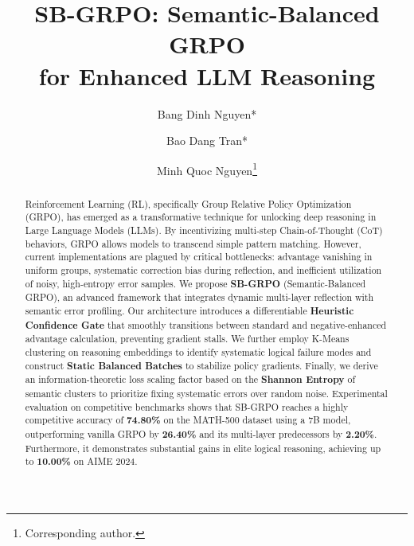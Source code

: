\documentclass[runningheads]{llncs}
\begin{document}
\title{SB-GRPO: Semantic-Balanced GRPO \\ for Enhanced LLM Reasoning}

\author{Bang Dinh Nguyen* \and Bao Dang Tran* \and Minh Quoc Nguyen\thanks{Corresponding author.}}

\maketitle

\begin{abstract}
Reinforcement Learning (RL), specifically Group Relative Policy Optimization (GRPO), has emerged as a transformative technique for unlocking deep reasoning in Large Language Models (LLMs). By incentivizing multi-step Chain-of-Thought (CoT) behaviors, GRPO allows models to transcend simple pattern matching. However, current implementations are plagued by critical bottlenecks: advantage vanishing in uniform groups, systematic correction bias during reflection, and inefficient utilization of noisy, high-entropy error samples. We propose \textbf{SB-GRPO} (Semantic-Balanced GRPO), an advanced framework that integrates dynamic multi-layer reflection with semantic error profiling. Our architecture introduces a differentiable \textbf{Heuristic Confidence Gate} that smoothly transitions between standard and negative-enhanced advantage calculation, preventing gradient stalls. We further employ K-Means clustering on reasoning embeddings to identify systematic logical failure modes and construct \textbf{Static Balanced Batches} to stabilize policy gradients. Finally, we derive an information-theoretic loss scaling factor based on the \textbf{Shannon Entropy} of semantic clusters to prioritize fixing systematic errors over random noise. Experimental evaluation on competitive benchmarks shows that SB-GRPO reaches a highly competitive accuracy of \textbf{74.80\%} on the MATH-500 dataset using a 7B model, outperforming vanilla GRPO by \textbf{26.40\%} and its multi-layer predecessors by \textbf{2.20\%}. Furthermore, it demonstrates substantial gains in elite logical reasoning, achieving up to \textbf{10.00\%} on AIME 2024.

\end{abstract}
\end{document}
